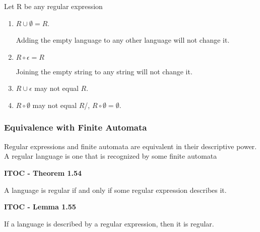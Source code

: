 Let R be any regular expression
\begin{enumerate}
\item $R\cup \emptyset = R$. 

Adding the empty language to any other language will not change it.

\item $R\circ \epsilon = R$

Joining the empty string to any string will not change it.

\item $R\cup \epsilon$ may not equal $R$.

\item $R\circ \emptyset$ may not equal $R$/, $R\circ \emptyset = \emptyset$.
\end{enumerate}

\subsubsection{Equivalence with Finite Automata}

Regular expressions and finite automata are equivalent in their descriptive power. A regular language is one that is recognized by some finite automata

\begin{shaded}
\textbf{ITOC - Theorem 1.54}

\medskip
A language is regular if and only if some regular expression describes it.
\end{shaded}

\begin{shaded}
\textbf{ITOC - Lemma 1.55}

\medskip
If a language is described by a regular expression, then it is regular.
\end{shaded}

